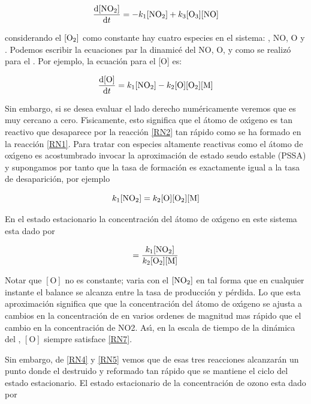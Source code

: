 \begin{equation}
\frac{\mathrm{d}[\ce{NO2}]}{\mathrm{d}t}=-k_1[\ce{NO2}]+k_3[\ce{O3}][\ce{NO}]
\label{RN4}
\end{equation}

considerando el $[\ce{O2}]$ como constante hay cuatro especies en el sistema: , NO, O y . Podemos escribir la ecuaciones par la dinamic\'e del NO, O, y  como se realiz\'o para el . Por ejemplo, la ecuaci\'on para el  [O] es:

\begin{equation}
\frac{\mathrm{d}[\ce{O}]}{\mathrm{d}t}=k_1[\ce{NO2}]-k_2[\ce{O}][\ce{O2}][\ce{M}]
\label{RN5}
\end{equation}

Sin embargo, si se desea evaluar el lado derecho num\'ericamente veremos que es muy cercano a cero. F\'{\i}sicamente, esto significa que el \'atomo de ox\'{\i}geno es tan reactivo que desaparece por la reacci\'on \ref{RN2}  tan r\'apido como se ha formado en la reacci\'on \ref{RN1}. Para tratar con especies altamente reactivas como el \'atomo de ox\'{\i}geno es acostumbrado invocar la aproximaci\'on de estado seudo estable (PSSA) y supongamos por tanto que la tasa de formaci\'on es exactamente igual a la tasa de desaparici\'on, por ejemplo

\begin{equation*}
k_1[\ce{NO2}]=k_2[\ce{O}][\ce{O2}][\ce{M}]
\end{equation*}

En el estado estacionario la concentraci\'on del \'atomo de ox\'{\i}geno en este sistema esta dado por

\begin{equation}
[\ce{O}]=\frac{k_1[\ce{NO2}]}{k_2[\ce{O2}][\ce{M}]}
\label{RN7}
\end{equation}

Notar que $[\textrm{O}]$ no es constante; varia con el $[\ce{NO2}]$ en tal forma que en cualquier instante el balance se alcanza entre la tasa de producci\'on y p\'erdida. Lo que esta aproximaci\'on significa que que la concentraci\'on del \'atomo de ox\'{\i}geno se ajusta a cambios en la concentraci\'on de  en varios ordenes de magnitud mas r\'apido que el cambio en la concentraci\'on de NO2. As\'{\i}, en la escala de tiempo de la din\'amica del , $[\textrm{O}]$ siempre satisface \ref{RN7}.

Sin embargo, de \ref{RN4} y \ref{RN5} vemos que de esas tres reacciones alcanzar\'an un punto donde el  destruido y reformado tan r\'apido que se mantiene el ciclo del estado estacionario. El estado estacionario de la concentraci\'on de ozono esta dado por

